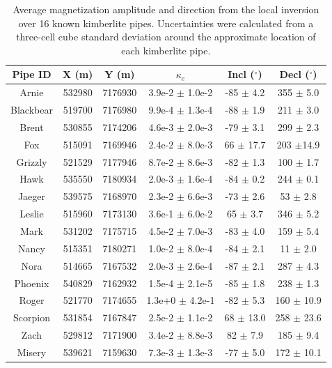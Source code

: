 \begin{table}[]
\centering
\caption{Average magnetization amplitude and direction from the local inversion over 16 known kimberlite pipes. Uncertainties were calculated from a three-cell cube standard deviation around the approximate location of each kimberlite pipe.}
\label{Local_Summary}
\renewcommand{\arraystretch}{1.}
\begin{tabular}{|c|c|c|c|c|c|}\hline
Pipe ID &	X (m) &	Y (m) &	$\kappa_{e}$ &	Incl ($^{\circ}$) &	Decl ($^{\circ}$) \\ \hline
Arnie &	532980 &	7176930 &	3.9e-2 $\pm$ 1.0e-2 &	 -85 $\pm$ 4.2 &	 355 $\pm$ 5.0 \\
Blackbear &	519700 &	7176980 &	9.9e-4 $\pm$ 1.3e-4 &	 -88 $\pm$ 1.9 &	 211 $\pm$ 3.0 \\
Brent &	530855 &	7174206 &	4.6e-3 $\pm$ 2.0e-3 &	 -79 $\pm$ 3.1 &	 299 $\pm$ 2.3 \\
Fox &	515091 &	7169946 &	2.4e-2 $\pm$ 8.0e-3 &	 66 $\pm$ 17.7 &	 203 $\pm$14.9 \\
Grizzly &	521529 &	7177946 &	8.7e-2 $\pm$ 8.6e-3 &	 -82 $\pm$ 1.3 &	 100 $\pm$ 1.7 \\
Hawk &	535550 &	7180934 &	2.0e-3 $\pm$ 1.6e-4 &	 -84 $\pm$ 0.2 &	 244 $\pm$ 0.1 \\
Jaeger &	539575 &	7168970 &	2.3e-2 $\pm$ 6.6e-3 &	 -73 $\pm$ 2.6 &	 53 $\pm$ 2.8 \\
Leslie &	515960 &	7173130 &	3.6e-1 $\pm$ 6.0e-2 &	 65 $\pm$ 3.7 &	 346 $\pm$ 5.2 \\
Mark &	531202 &	7175715 &	4.5e-2 $\pm$ 7.0e-3 &	 -83 $\pm$ 4.0 &	 159 $\pm$ 5.4 \\
Nancy &	515351 &	7180271 &	1.0e-2 $\pm$ 8.0e-4 &	 -84 $\pm$ 2.1 &	 11 $\pm$ 2.0 \\
Nora &	514665 &	7167532 &	2.0e-3 $\pm$ 2.6e-4 &	 -87 $\pm$ 2.1 &	 287 $\pm$ 4.3 \\
Phoenix &	540829 &	7162932 &	1.5e-4 $\pm$ 2.1e-5 &	 -85 $\pm$ 1.8 &	 238 $\pm$ 1.3 \\
Roger &	521770 &	7174655 &	1.3e+0 $\pm$ 4.2e-1 &	 -82 $\pm$ 5.3 &	 160 $\pm$ 10.9 \\
Scorpion &	531854 &	7167847 &	2.5e-2 $\pm$ 1.1e-2 &	 68 $\pm$ 13.0 &	 258 $\pm$ 23.6 \\
Zach &	529812 &	7171900 &	3.4e-2 $\pm$ 8.8e-3 &	 82 $\pm$ 7.9 &	 185 $\pm$ 9.4 \\
Misery &	539621 &	7159630 &	7.3e-3 $\pm$ 1.3e-3 &	 -77 $\pm$ 5.0 &	 172 $\pm$ 10.1 \\ \hline
\end{tabular}
\end{table}

